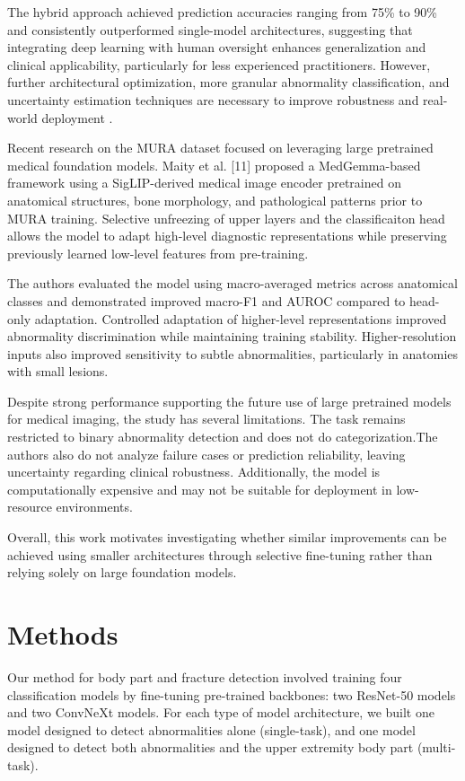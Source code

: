 \documentclass[conference]{IEEEtran}
\begin{document}
The hybrid approach achieved prediction accuracies ranging from 75\% to 90\% and consistently outperformed single-model architectures, suggesting that integrating deep learning with human oversight enhances generalization and clinical applicability, particularly for less experienced practitioners. However, further architectural optimization, more granular abnormality classification, and uncertainty estimation techniques are necessary to improve robustness and real-world deployment \cite{duan2024_msk_xray_dl}.

Recent research on the MURA dataset focused on leveraging large pretrained medical foundation models. Maity et al. [11] proposed a MedGemma-based framework using a SigLIP-derived medical image encoder pretrained on anatomical structures, bone morphology, and pathological patterns prior to MURA training. Selective unfreezing of upper layers and the classificaiton head allows the model to adapt high-level diagnostic representations while preserving previously learned low-level features from pre-training.

The authors evaluated the model using macro-averaged metrics across anatomical classes and demonstrated improved macro-F1 and AUROC compared to head-only adaptation. Controlled adaptation of higher-level representations improved abnormality discrimination while maintaining training stability. Higher-resolution inputs also improved sensitivity to subtle abnormalities, particularly in anatomies with small lesions.

Despite strong performance supporting the future use of large pretrained models for medical imaging, the study has several limitations. The task remains restricted to binary abnormality detection and does not do categorization.The authors also do not analyze failure cases or prediction reliability, leaving uncertainty regarding clinical robustness. Additionally, the model is computationally expensive and may not be suitable for deployment in low-resource environments. 

Overall, this work motivates investigating whether similar improvements can be achieved using smaller architectures through selective fine-tuning rather than relying solely on large foundation models.




\section{Methods}
Our method for body part and fracture detection involved training four classification models by fine-tuning pre-trained backbones: two ResNet-50 models and two ConvNeXt models. For each type of model architecture, we built one model designed to detect abnormalities alone (single-task), and one model designed to detect both abnormalities and the upper extremity body part (multi-task).
\end{document}
